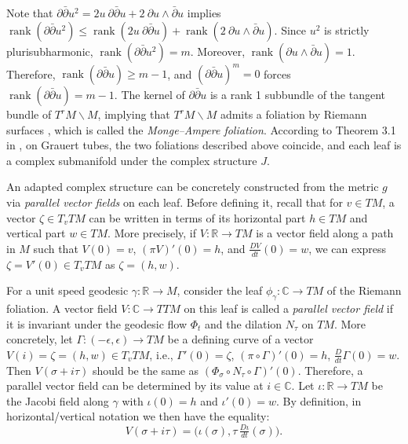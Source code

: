 \documentclass[a4paper, 12pt]{article}
\newcommand{\bC}{\mathbb{C}}
\newcommand{\bR}{\mathbb{R}}
\begin{document}
Note that $\partial\bar\partial u^2=2u~\partial\bar\partial u+2~\partial u\wedge\bar\partial u$ implies $\operatorname{rank}(\partial\bar\partial u^2)\le\operatorname{rank}(2u~\partial\bar\partial u)+\operatorname{rank}(2~\partial u\wedge\bar\partial u)$. Since $u^2$ is strictly plurisubharmonic, $\operatorname{rank}(\partial\bar{\partial} u^2)=m$. Moreover, $\operatorname{rank}(\partial u\wedge\bar{\partial} u)=1$. Therefore, $\operatorname{rank}(\partial\bar{\partial} u)\ge m-1$, and $(\partial\bar\partial u)^m=0$ forces $\operatorname{rank}(\partial\bar{\partial} u)=m-1$. The kernel of $\partial\bar{\partial} u$ is a rank 1 subbundle of the tangent bundle of $T^rM\backslash M$, implying that $T^rM\backslash M$ admits a foliation by Riemann surfaces \cite{BK77}, which is called the \emph{Monge--Ampere foliation}. According to Theorem 3.1 in \cite{LS91}, on Grauert tubes, the two foliations described above coincide, and each leaf is a complex submanifold under the complex structure $J$.



An adapted complex structure can be concretely constructed from the metric $g$ via \textit{parallel vector fields} on each leaf. Before defining it, recall that for $v\in TM$, a vector $\zeta \in T_vTM$ can be written in terms of its horizontal part $h\in TM$ and vertical part $w\in TM$. More precisely, if  $V:\bR\rightarrow TM$ is a vector field along a path in $M$ such that $V(0)=v$, $(\pi V)'(0)=h$, and $\frac{DV}{dt}(0)=w$, we can express $\zeta=V'(0)\in T_vTM$ as $\zeta=(h,w)$.

For a unit speed geodesic $\gamma:\bR\rightarrow M$, consider the leaf $\phi_\gamma:\bC\rightarrow TM$ of the Riemann foliation. A vector field $V:\bC\rightarrow TTM$ on this leaf is called a \emph{parallel vector field} if it is invariant under the geodesic flow $\Phi_t$ and the dilation $N_\tau$ on $TM$. More concretely, let $\Gamma:(-\epsilon,\epsilon)\rightarrow TM$ be a defining curve of a vector $V(i)=\zeta=(h,w)\in T_vTM$, i.e., $\Gamma'(0)=\zeta$, $(\pi\circ\Gamma)'(0)=h$, $\frac{D}{dt}\Gamma(0)=w$. Then $V(\sigma+i\tau)$ should be the same as $(\Phi_\sigma\circ N_\tau\circ\Gamma)'(0)$. Therefore, a parallel vector field can be determined by its value at $i\in\bC$. Let $\iota:\bR\rightarrow TM$ be the Jacobi field along $\gamma$ with 
$\iota(0)=h$ and $\iota'(0)=w$. 
By definition, in horizontal/vertical notation we then have the equality: 
\[
V(\sigma + i\tau) = \bigl(\iota(\sigma),\tau\,\tfrac{D\iota}{dt}(\sigma)\bigr). 
\]
\end{document}
